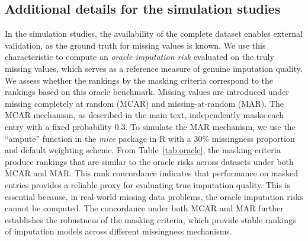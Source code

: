 \documentclass[aos, preprint]{imsart}
\theoremstyle{plain}
\theoremstyle{definition}
\begin{document}
\begin{appendix}
\section{Additional details for the simulation studies} \label{sec::appendix_sim}
In the simulation studies, the availability of the complete dataset enables external validation, as the ground truth for missing values is known. We use this characteristic to compute an \textit{oracle imputation risk} evaluated on the truly missing values, which serves as a reference measure of genuine imputation quality. We assess whether the rankings by the masking criteria correspond to the rankings based on this oracle benchmark. Missing values are introduced under missing completely at random (MCAR) and missing-at-random (MAR). The MCAR mechanism, as described in the main text, independently masks each entry with a fixed probability 0.3. To simulate the MAR mechanism, we use the ``ampute'' function in the \textit{mice} package in R with a 30\% missingness proportion and default weighting scheme. 
From Table~\ref{tab:oracle}, the masking criteria produce rankings that are similar to the oracle risks across datasets under both MCAR and MAR. This rank concordance indicates that performance on masked entries provides a reliable proxy for evaluating true imputation quality. This is essential because, in real-world missing data problems, the oracle imputation risks cannot be computed. The concordance under both MCAR and MAR further establishes the robustness of the masking criteria, which provide stable rankings of imputation models across different missingness mechanisms.


\begin{table}[htbp!]
\centering
\caption{Ranks of imputation methods under masking criteria and corresponding oracle imputation risks across the iris, yacht, and concrete data for (a) MCAR and (b) MAR missingness mechanisms. Smaller rank indicates small risk.}
\label{tab:oracle}


\end{table}
\end{appendix}
\end{document}
